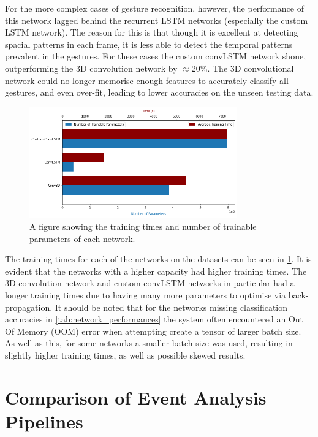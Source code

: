 For the more complex cases of gesture recognition, however, the performance of this network lagged behind the recurrent LSTM networks (especially the custom LSTM network). The reason for this is that though it is excellent at detecting spacial patterns in each frame, it is less able to detect the temporal patterns prevalent in the gestures. For these cases the custom convLSTM network shone, outperforming the 3D convolution network by $ \approx 20\% $. The 3D convolutional network could no longer memorise enough features to accurately classify all gestures, and even over-fit, leading to lower accuracies on the unseen testing data.

\begin{figure}[htb]
    \centering
    \includegraphics[width=0.8\textwidth]{testingandresults/images/training_time_and_trainable_parameters.png}
    \caption{A figure showing the training times and number of trainable parameters of each network.}
    \label{fig:training_times_and_trainable_parameters}
\end{figure}

The training times for each of the networks on the datasets can be seen in \cref{fig:training_times_and_trainable_parameters}. It is evident that the networks with a higher capacity had higher training times. The 3D convolution network and custom convLSTM networks in particular had a longer training times due to having many more parameters to optimise via back-propagation. It should be noted that for the networks missing classification accuracies in \cref{tab:network_performances} the system often encountered an Out Of Memory (OOM) error when attempting create a tensor of larger batch size. As well as this, for some networks a smaller batch size was used, resulting in slightly higher training times, as well as possible skewed results.

\section{Comparison of Event Analysis Pipelines}

